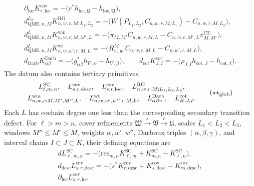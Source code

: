 \begin{defn}
\[\begin{gathered}
    \partial_{\mathrm{loc}}K^{\mathrm{cov}}_{r,\mathrm{loc}}
    =-\bigl(r^*h_{\mathrm{loc},\mathfrak U}
      -h_{\mathrm{loc},\mathfrak V}\bigr),\\
	    d^{L_2}_{\mathrm{QME},n,M}K^{\mathrm{RG}}_{n,w,r,M;L_1,L_2}
	    =-\bigl(W(P_{L_1,L_2},C_{n,w,r,M,L_1})
	      -C_{n,w,r,M,L_2}\bigr),\\
	    d^{L}_{\mathrm{QME},n,M}K^{\mathrm{win}}_{n,w,r;M,M',L}
	    =-\bigl(\pi_{M,M'}C_{n,w,r,M,L}
	      -C_{n,w,r,M',L}\pi^{\mathrm{CE}}_{M,M'}\bigr),\\
	    d^{L}_{\mathrm{QME},n,M}K^{\mathrm{wt}}_{n,w,w';r,M,L}
	    =-\bigl(R^M_{w,w'}C_{n,w,r,M,L}-C_{n,w',r,M,L}\bigr),\\
    d_{\mathrm{Darb}}K^{\mathrm{Darb}}_{\alpha\beta}
    =-\bigl(g_{\alpha\beta}^*h_{\nabla,\alpha}
      -h_{\nabla,\beta}\bigr),\qquad
    d_{\mathrm{cot}}K^{\mathrm{cot}}_{J,I}
    =-\bigl(\rho_{J,I}h_{\mathrm{cot},J}-h_{\mathrm{cot},I}\bigr).
  \end{gathered}
  \]
  The datum also contains tertiary primitives
  \[
  \begin{gathered}
    L^{\mathrm{SC}}_{\ell,m,n},\quad
    L^{\mathrm{cov}}_{s,r,\mathrm{desc}},\quad
    L^{\mathrm{cov}}_{s,r,\mathrm{loc}},\quad
    L^{\mathrm{RG}}_{n,w,r,M;L_1,L_2,L_3},\\
    L^{\mathrm{win}}_{n,w,r;M,M',M'',L},\quad
    L^{\mathrm{wt}}_{n,w,w',w'';r,M,L},\quad
    L^{\mathrm{Darb}}_{\alpha\beta\gamma},\quad
    L^{\mathrm{cot}}_{K,J,I}.
  \end{gathered}
  \tag{\(\star\star_{\mathrm{glob}}\)}
  \label{eq:global-tertiary-primitive-compatibility-datum}
  \]
  Each \(L\) has cochain degree one less than the corresponding
  secondary transition defect.  For \(\ell>m>n\), cover refinements
  \(\mathfrak W\xrightarrow{s}\mathfrak V\xrightarrow{r}\mathfrak U\),
  scales \(L_1<L_2<L_3\), windows \(M''\leq M'\leq M\), weights
  \(w,w',w''\), Darboux triples \((\alpha,\beta,\gamma)\), and interval
  chains \(I\subset J\subset K\), their defining equations are
  \[
  \begin{gathered}
    dL^{\mathrm{SC}}_{\ell,m,n}
    =
    -\bigl(\mathrm{res}_{m,n}K^{\mathrm{SC}}_{\ell,m}
      +K^{\mathrm{SC}}_{m,n}-K^{\mathrm{SC}}_{\ell,n}\bigr),\\
    d_{\mathrm{desc}}L^{\mathrm{cov}}_{s,r,\mathrm{desc}}
    =
    -\bigl(s^*K^{\mathrm{cov}}_{r,\mathrm{desc}}
      +K^{\mathrm{cov}}_{s,\mathrm{desc}}
      -K^{\mathrm{cov}}_{rs,\mathrm{desc}}\bigr),\\
    \partial_{\mathrm{loc}}L^{\mathrm{cov}}_{s,r,\mathrm{loc}}

\end{gathered}\]
\end{defn}
